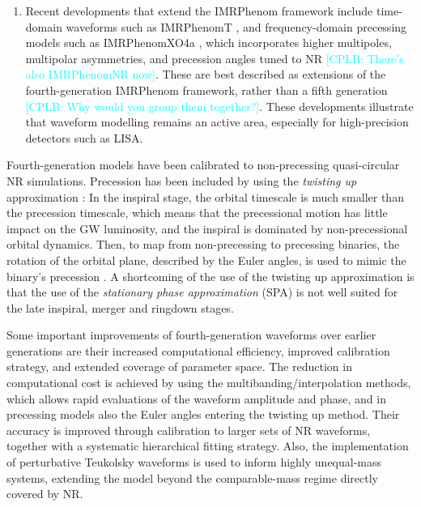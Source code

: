 \documentclass[a4paper,12pt]{article}
\newcommand{\cplb}[1]{\textcolor{cyan}{[CPLB: #1]}}
\begin{document}
\begin{enumerate}
        \begin{enumerate}
        \item Phenom XHM \cite{garcia2020imrphenomxhm} adds higher harmonics to PhenomXAS, and PhenomXPHM \cite{pratten2021computationally} adds higher harmonics and spin precession.
        \end{enumerate}
    \item Recent developments that extend the IMRPhenom framework include time-domain waveforms such as IMRPhenomT \cite{estelles2022time}, and frequency-domain precessing models such as IMRPhenomXO4a \cite{thompson2024phenomenological}, which incorporates higher multipoles, multipolar asymmetries, and precession angles tuned to NR \cplb{There's also IMRPhenomNR now}. These are best described as extensions of the fourth-generation IMRPhenom framework, rather than a fifth generation \cplb{Why would you group them together?}. These developments illustrate that waveform modelling remains an active area, especially for high-precision detectors such as LISA.
\end{enumerate}

Fourth-generation models have been calibrated to non-precessing quasi-circular NR simulations. 
Precession has been included by using the \textit{twisting up} approximation \cite{hannam2014simple,afshordi2023waveform}: In the inspiral stage, the orbital timescale is much smaller than the precession timescale, which means that the precessional motion has little impact on the GW luminosity, and the inspiral is dominated by non-precessional orbital dynamics\cite{afshordi2023waveform}. Then, to map from non-precessing to precessing binaries, the rotation of the orbital plane, described by the Euler angles, is used to mimic the binary's precession \cite{hannam2014simple}. A shortcoming of the use of the twisting up approximation is that the use of the \textit{stationary phase approximation} (SPA)\cite{cutler1994gravitational} is not well suited for the late inspiral, merger and ringdown stages\cite{marsat2018fourier}. 

Some important improvements of fourth-generation waveforms over earlier generations are their increased computational efficiency, improved calibration strategy, and extended coverage of parameter space. The reduction in computational cost is achieved by using the multibanding/interpolation methods, which allows rapid evaluations of the waveform amplitude and phase, and in precessing models also the Euler angles entering the twisting up method\cite{pratten2021computationally}. Their accuracy is improved through calibration to larger sets of NR waveforms, together with a systematic hierarchical fitting strategy\cite{Pratten_2020,garcia2020imrphenomxhm}. Also, the implementation of perturbative Teukolsky waveforms is used to inform highly unequal-mass systems, extending the model beyond the comparable-mass regime directly covered by NR\cite{garcia2020imrphenomxhm}.
\end{document}
